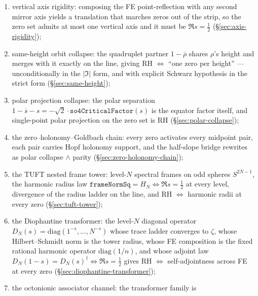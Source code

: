 \documentclass[11pt]{amsart}
\begin{document}
\begin{enumerate}[label=(\roman*),nosep]
      equivalence \texttt{InteriorAssemblyNonzero}\,$\Leftrightarrow$\,RH,
      the SO(4) spectral-line transformer $n\mapsto n^{-s}$ with FE pairing
      $\lVert n^{-s}\rVert\lVert n^{-(1-s)}\rVert=1/n$, and
      RH $\Leftrightarrow$ square-root spectral weights at every zero
      (\S\ref{sec:resonance-channeling});
\item vertical axis rigidity: composing the FE point-reflection with any
      second mirror axis yields a translation that marches zeros out of the
      strip, so the zero set admits at most one vertical axis and it must be
      $\Re s=\tfrac12$ (\S\ref{sec:axis-rigidity});
\item same-height orbit collapse: the quadruplet partner $1-\overline{\rho}$
      shares $\rho$'s height and merges with it exactly on the line, giving
      RH $\Leftrightarrow$ ``one zero per height'' --- unconditionally in
      the $\lvert\Im\rvert$ form, and with explicit Schwarz hypothesis in
      the strict form (\S\ref{sec:same-height});
\item polar projection collapse: the polar separation
      $1-\overline{s}-s=-\sqrt2\cdot\texttt{so4CriticalFactor}(s)$ is the
      equator factor itself, and single-point polar projection on the zero
      set is RH (\S\ref{sec:polar-collapse});
\item the zero--holonomy--Goldbach chain: every zero activates every
      midpoint pair, each pair carries Hopf holonomy support, and the
      half-slope bridge rewrites as polar collapse $\wedge$ parity
      (\S\ref{sec:zero-holonomy-chain});
\item the TUFT nested frame tower: level-$N$ spectral frames on odd spheres
      $S^{2N-1}$, the harmonic radius law
      $\texttt{frameNormSq}=H_N\Leftrightarrow\Re s=\tfrac12$ at every
      level, divergence of the radius ladder on the line, and RH
      $\Leftrightarrow$ harmonic radii at every zero
      (\S\ref{sec:tuft-tower});
\item the Diophantine transformer: the level-$N$ diagonal operator
      $D_N(s)=\mathrm{diag}(1^{-s},\dots,N^{-s})$ whose trace ladder
      converges to $\zeta$, whose Hilbert--Schmidt norm is the tower
      radius, whose FE composition is the fixed rational harmonic operator
      $\mathrm{diag}(1/n)$, and whose adjoint law
      $D_N(1-s)=D_N(s)^{\dagger}\Leftrightarrow\Re s=\tfrac12$ gives RH
      $\Leftrightarrow$ self-adjointness across FE at every zero
      (\S\ref{sec:diophantine-transformer});
\item the octonionic associator channel: the transformer family is

\end{enumerate}
\end{document}
